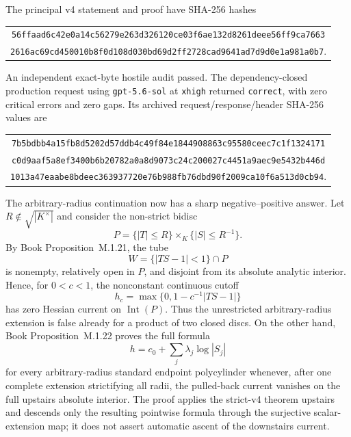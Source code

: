 \documentclass[11pt,a4paper]{article}
\theoremstyle{definition}
\theoremstyle{remark}
\begin{document}
The principal v4 statement and proof have SHA-256 hashes
\begin{center}
\small
\begin{tabular}{@{}c@{}}
\nolinkurl{56ffaad6c42e0a14c56279e263d326120ce03f6ae132d8261deee56ff9ca7663}\\
\nolinkurl{2616ac69cd450010b8f0d108d030bd69d2ff2728cad9641ad7d9d0e1a981a0b7}.
\end{tabular}
\end{center}
An independent exact-byte hostile audit passed.  The dependency-closed
production request using \texttt{gpt-5.6-sol} at \texttt{xhigh} returned
\texttt{correct}, with zero critical errors and zero gaps.  Its archived
request/response/header SHA-256 values are
\begin{center}
\small
\begin{tabular}{@{}c@{}}
\nolinkurl{7b5bdbb4a15fb8d5202d57ddb4c49f84e1844908863c95580ceec7c1f1324171}\\
\nolinkurl{c0d9aaf5a8ef3400b6b20782a0a8d9073c24c200027c4451a9aec9e5432b446d}\\
\nolinkurl{1013a47eaabe8bdeec363937720e76b988fb76dbd90f2009ca10f6a513d0cb94}.
\end{tabular}
\end{center}

The arbitrary-radius continuation now has a sharp negative--positive answer.
Let \(R\notin\sqrt{|K^\times|}\) and consider the non-strict bidisc
\[
 P=\{|T|\leq R\}\times_K\{|S|\leq R^{-1}\}.
\]
By Book Proposition~M.1.21, the tube
\[
 W=\{|TS-1|<1\}\cap P
\]
is nonempty, relatively open in \(P\), and disjoint from its absolute
analytic interior.  Hence, for \(0<c<1\), the nonconstant continuous cutoff
\[
 h_c=\max\{0,1-c^{-1}|TS-1|\}
\]
has zero Hessian current on \(\operatorname{Int}(P)\).  Thus the
unrestricted arbitrary-radius extension is false already for a product of
two closed discs.  On the other hand,
Book Proposition~M.1.22 proves the full formula
\[
                    h=c_0+\sum_j\lambda_j\log|S_j|
\]
for every arbitrary-radius standard endpoint polycylinder whenever, after
one complete extension strictifying all radii, the pulled-back current
vanishes on the full upstairs absolute interior.  The proof applies the
strict-v4 theorem upstairs and descends only the resulting pointwise formula
through the surjective scalar-extension map; it does not assert automatic
ascent of the downstairs current.
\end{document}
